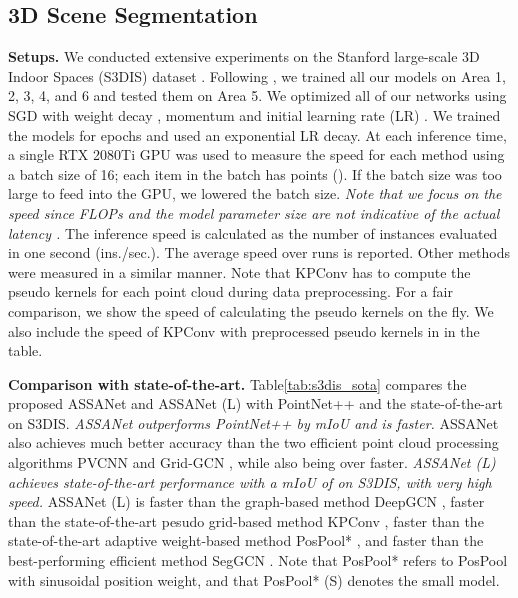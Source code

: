 \documentclass{article}
\newcommand{\tblLabel}{Table\xspace}
\newcommand{\mysection}[1]{\vspace{3pt}\noindent\textbf{#1.}}
\begin{document}
\subsection{3D Scene Segmentation}
\mysection{Setups} 
We conducted extensive experiments on the Stanford large-scale 3D Indoor Spaces (S3DIS) dataset \cite{s3dis}. Following \cite{PointCNN, Liu2019PointVoxelCF, Liu2020ACL}, we trained all our models on Area 1, 2, 3, 4, and 6 and tested them on Area 5. We optimized all of our networks using SGD with weight decay , momentum  and initial learning rate (LR) . We trained the models for  epochs and used an exponential LR decay. At each inference time, a single RTX 2080Ti GPU was used to measure the speed for each method using a batch size of 16; each item in the batch has  points (). If the batch size was too large to feed into the GPU, we lowered the batch size. \textit{Note that we focus on the speed since FLOPs and the model parameter size are not indicative of the actual latency \cite{Ma2018ShuffleNetVP, Liu2019PointVoxelCF}.}  The inference speed is calculated as the number of instances evaluated in one second (ins./sec.). The average speed over  runs is reported. Other methods were measured in a similar manner. Note that KPConv \cite{Thomas2019KPConvFA} has to compute the pseudo kernels for each point cloud during data preprocessing. For a fair comparison, we show the speed of calculating the pseudo kernels on the fly.  We also include the speed of KPConv with preprocessed pseudo kernels in  in the table.


\mysection{Comparison with state-of-the-art}
\tblLabel \ref{tab:s3dis_sota} compares the proposed ASSANet and ASSANet (L) with PointNet++ \cite{Qi2017PointNetDH} and the state-of-the-art on S3DIS. \textit{ASSANet outperforms PointNet++ by  mIoU and is  faster.} ASSANet also achieves much better accuracy than the two efficient point cloud processing algorithms PVCNN \cite{Liu2019PointVoxelCF} and Grid-GCN \cite{Xu2020GridGCNFF}, while also being over  faster. 
\textit{ASSANet (L) achieves state-of-the-art performance with a mIoU of  on S3DIS, with very high speed.} ASSANet (L) is  faster than the graph-based method DeepGCN \cite{Li2019DeepGCNs},  faster than the state-of-the-art pesudo grid-based method KPConv \cite{Thomas2019KPConvFA},  faster than the state-of-the-art adaptive weight-based method PosPool* \cite{Liu2020ACL}, and  faster than the best-performing efficient method SegGCN \cite{Lei2020SegGCNE3}. Note that PosPool* refers to PosPool with sinusoidal position weight, and that PosPool* (S) denotes the small model.
\end{document}
